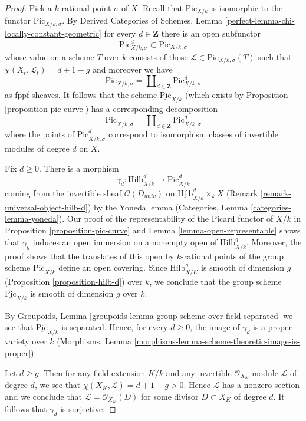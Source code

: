 \documentclass[10pt,a4paper]{amsart}
\theoremstyle{plain}
\theoremstyle{definition}
\theoremstyle{remark}
\numberwithin{equation}{subsection}
\def\Hilbfunctor{\mathrm{Hilb}}
\def\Picardfunctor{\mathrm{Pic}}
\begin{document}
\begin{proof}
Pick a $k$-rational point $\sigma$ of $X$. Recall that $\Picardfunctor_{X/k}$
is isomorphic to the functor $\Picardfunctor_{X/k, \sigma}$. By
Derived Categories of Schemes, Lemma
\ref{perfect-lemma-chi-locally-constant-geometric}
for every $d \in \mathbf{Z}$ there is an open subfunctor
$$
\Picardfunctor^d_{X/k, \sigma} \subset \Picardfunctor_{X/k, \sigma}
$$
whose value on a scheme $T$ over $k$ consists of those
$\mathcal{L} \in \Picardfunctor_{X/k, \sigma}(T)$ such that
$\chi(X_t, \mathcal{L}_t) = d + 1 - g$ and moreover we have
$$
\Picardfunctor_{X/k, \sigma} =
\coprod\nolimits_{d \in \mathbf{Z}} \Picardfunctor^d_{X/k, \sigma}
$$
as fppf sheaves. It follows that the scheme $\underline{\Picardfunctor}_{X/k}$
(which exists by Proposition \ref{proposition-pic-curve})
has a corresponding decomposition
$$
\underline{\Picardfunctor}_{X/k, \sigma} =
\coprod\nolimits_{d \in \mathbf{Z}} \underline{\Picardfunctor}^d_{X/k, \sigma}
$$
where the points of $\underline{\Picardfunctor}^d_{X/k, \sigma}$ correspond
to isomorphism classes of invertible modules of degree $d$ on $X$.

\medskip\noindent
Fix $d \geq 0$. There is a morphism
$$
\gamma_d :
\underline{\Hilbfunctor}^d_{X/k}
\longrightarrow
\underline{\Picardfunctor}^d_{X/k}
$$
coming from the invertible sheaf $\mathcal{O}(D_{univ})$ on
$\underline{\Hilbfunctor}^d_{X/k} \times_k X$
(Remark \ref{remark-universal-object-hilb-d}) by the Yoneda lemma
(Categories, Lemma \ref{categories-lemma-yoneda}).
Our proof of the representability of the Picard functor of $X/k$
in Proposition \ref{proposition-pic-curve} and
Lemma \ref{lemma-open-representable} shows that $\gamma_g$
induces an open immersion on a nonempty open of
$\underline{\Hilbfunctor}^g_{X/k}$. Moreover, the proof shows
that the translates of this open by $k$-rational points of
the group scheme $\underline{\Picardfunctor}_{X/k}$ define
an open covering. Since
$\underline{\Hilbfunctor}^g_{X/K}$ is smooth of dimension $g$
(Proposition \ref{proposition-hilb-d})
over $k$, we conclude that the
group scheme $\underline{\Picardfunctor}_{X/k}$ is smooth of dimension $g$
over $k$.

\medskip\noindent
By Groupoids, Lemma \ref{groupoids-lemma-group-scheme-over-field-separated}
we see that $\underline{\Picardfunctor}_{X/k}$ is separated.
Hence, for every $d \geq 0$, the image of $\gamma_d$
is a proper variety over $k$
(Morphisms, Lemma \ref{morphisms-lemma-scheme-theoretic-image-is-proper}).

\medskip\noindent
Let $d \geq g$. Then for any field extension $K/k$ and any invertible
$\mathcal{O}_{X_K}$-module $\mathcal{L}$ of degree $d$, we see that
$\chi(X_K, \mathcal{L}) = d + 1 - g > 0$. Hence $\mathcal{L}$ has a
nonzero section and we conclude that $\mathcal{L} = \mathcal{O}_{X_K}(D)$
for some divisor $D \subset X_K$ of degree $d$. It follows that
$\gamma_d$ is surjective.


\end{proof}
\end{document}
